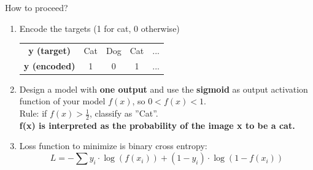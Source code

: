 \documentclass[handout]{beamer}
\begin{document}
\begin{frame}{How to proceed?}

\begin{enumerate}[<+->]
    \item Encode the targets (1 for cat, 0 otherwise)
    \begin{table}[]
    \centering
    \begin{tabular}{ccccc}
    
        {\bf y (target)} & Cat & Dog & Cat & ...\\
         {\bf y (encoded)} & 1 & 0 & 1 & ...\\
        
    \end{tabular}
\end{table}
    \item Design a model with \alert{\bf one output } and use the \alert{\bf sigmoid} as output activation function of your model $f(x)$, so $0 < f(x) < 1$.\\
    Rule: if $f(x)>\frac{1}{2}$, classify as ''Cat''.\\
    \alert{\bf f(x) is interpreted as the probability of the image x to be a cat.}
    \item Loss function to minimize is binary cross entropy:
    $$
    L = -\sum y_i \cdot \log(f(x_i)) + (1-y_i)\cdot \log (1-f(x_i))
    $$
\end{enumerate}    
\end{frame}
\end{document}
